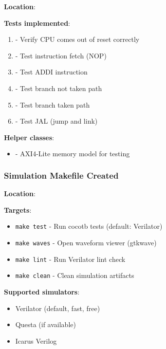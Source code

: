 \begin{record}

\textbf{Location}: 

\textbf{Tests implemented}:

\begin{enumerate}
\def\labelenumi{\arabic{enumi}.}
\tightlist
\item
   - Verify CPU comes out of reset correctly
\item
   - Test instruction fetch (NOP)
\item
   - Test ADDI instruction
\item
   - Test branch not taken path
\item
   - Test branch taken path
\item
   - Test JAL (jump and link)
\end{enumerate}

\textbf{Helper classes}:

\begin{itemize}
\tightlist
\item
   - AXI4-Lite memory model for testing
\end{itemize}

\end{record}

\subsubsection{Simulation Makefile Created}\label{cr:fix:cpu-verification-ready:simulation-makefile-created}

\begin{record}

\textbf{Location}: 

\textbf{Targets}:

\begin{itemize}
\tightlist
\item
  \texttt{make\ test} - Run cocotb tests (default: Verilator)
\item
  \texttt{make\ waves} - Open waveform viewer (gtkwave)
\item
  \texttt{make\ lint} - Run Verilator lint check
\item
  \texttt{make\ clean} - Clean simulation artifacts
\end{itemize}

\textbf{Supported simulators}:

\begin{itemize}
\tightlist
\item
  Verilator (default, fast, free)
\item
  Questa (if available)
\item
  Icarus Verilog
\end{itemize}

\end{record}

